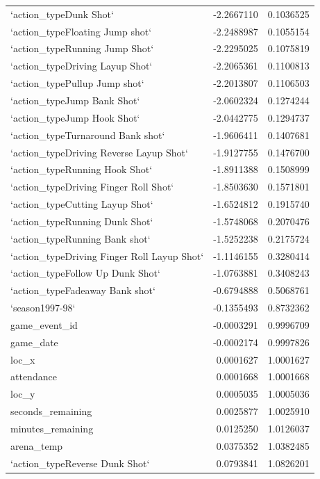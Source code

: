 \documentclass[american,]{article}
\begin{document}
\begin{tabular}{lrr}
`action\_typeDunk Shot` & -2.2667110 & 0.1036525\\
\addlinespace
`action\_typeFloating Jump shot` & -2.2488987 & 0.1055154\\
`action\_typeRunning Jump Shot` & -2.2295025 & 0.1075819\\
`action\_typeDriving Layup Shot` & -2.2065361 & 0.1100813\\
`action\_typePullup Jump shot` & -2.2013807 & 0.1106503\\
`action\_typeJump Bank Shot` & -2.0602324 & 0.1274244\\
\addlinespace
`action\_typeJump Hook Shot` & -2.0442775 & 0.1294737\\
`action\_typeTurnaround Bank shot` & -1.9606411 & 0.1407681\\
`action\_typeDriving Reverse Layup Shot` & -1.9127755 & 0.1476700\\
`action\_typeRunning Hook Shot` & -1.8911388 & 0.1508999\\
`action\_typeDriving Finger Roll Shot` & -1.8503630 & 0.1571801\\
\addlinespace
`action\_typeCutting Layup Shot` & -1.6524812 & 0.1915740\\
`action\_typeRunning Dunk Shot` & -1.5748068 & 0.2070476\\
`action\_typeRunning Bank shot` & -1.5252238 & 0.2175724\\
`action\_typeDriving Finger Roll Layup Shot` & -1.1146155 & 0.3280414\\
`action\_typeFollow Up Dunk Shot` & -1.0763881 & 0.3408243\\
\addlinespace
`action\_typeFadeaway Bank shot` & -0.6794888 & 0.5068761\\
`season1997-98` & -0.1355493 & 0.8732362\\
game\_event\_id & -0.0003291 & 0.9996709\\
game\_date & -0.0002174 & 0.9997826\\
loc\_x & 0.0001627 & 1.0001627\\
\addlinespace
attendance & 0.0001668 & 1.0001668\\
loc\_y & 0.0005035 & 1.0005036\\
seconds\_remaining & 0.0025877 & 1.0025910\\
minutes\_remaining & 0.0125250 & 1.0126037\\
arena\_temp & 0.0375352 & 1.0382485\\
\addlinespace
`action\_typeReverse Dunk Shot` & 0.0793841 & 1.0826201\\

\end{tabular}
\end{document}
